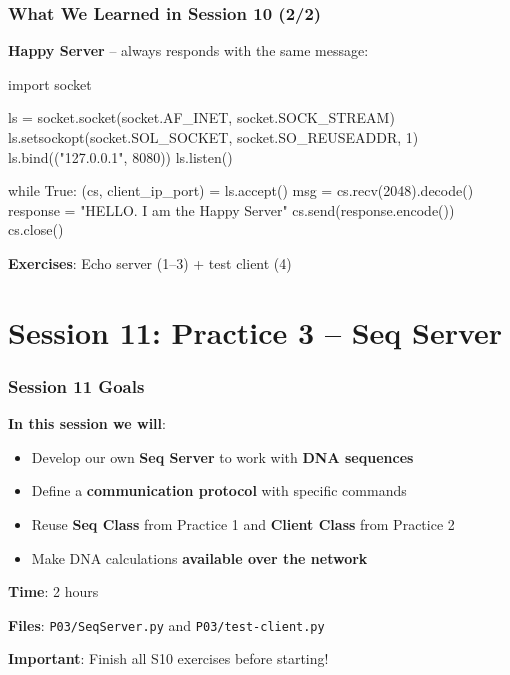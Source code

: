 \documentclass[xcolor=table]{beamer}
\begin{document}
\begin{frame}[fragile]
\frametitle{What We Learned in Session 10 (2/2)}

\textbf{Happy Server} -- always responds with the same message:

\vspace{0.1cm}

\begin{python}
import socket

ls = socket.socket(socket.AF_INET,
                   socket.SOCK_STREAM)
ls.setsockopt(socket.SOL_SOCKET,
              socket.SO_REUSEADDR, 1)
ls.bind(("127.0.0.1", 8080))
ls.listen()

while True:
    (cs, client_ip_port) = ls.accept()
    msg = cs.recv(2048).decode()
    response = "HELLO. I am the Happy Server\n"
    cs.send(response.encode())
    cs.close()
\end{python}

\vspace{0.1cm}

\textbf{Exercises}: Echo server (1--3) + test client (4)

\end{frame}


\section{Session 11: Practice 3 -- Seq Server}

\begin{frame}
\frametitle{Session 11 Goals}

\textbf{In this session we will}:

\begin{itemize}
\item Develop our own \textbf{Seq Server} to work with \textbf{DNA sequences}
\item Define a \textbf{communication protocol} with specific commands
\item Reuse \textbf{Seq Class} from Practice 1 and \textbf{Client Class} from Practice 2
\item Make DNA calculations \textbf{available over the network}
\end{itemize}

\vspace{0.4cm}

\textbf{Time}: 2 hours

\vspace{0.2cm}

\textbf{Files}: \texttt{P03/SeqServer.py} and \texttt{P03/test-client.py}

\vspace{0.2cm}

\textbf{Important}: Finish all S10 exercises before starting!

\end{frame}
\end{document}
